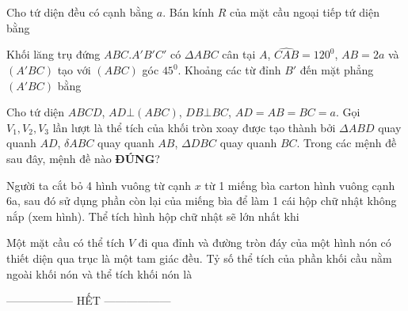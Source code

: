 \documentclass[12pt]{article}
\begin{document}
\begin{vnmultiplechoice}[keycolumns=3]
\begin{question}%
Cho tứ diện đều có cạnh bằng $a$. Bán kính $R$ của mặt cầu ngoại tiếp tứ diện bằng
\vspace{0.2cm}
\datcot
\bonpa
{}
{}
{}
{}
\end{question}

\begin{question}%
Khối lăng trụ đứng $ABC.A'B'C'$ có $\Delta ABC$ cân tại $A$, $\widehat{CAB}=120^0$, $AB=2a$ và $(A'BC)$ tạo với $(ABC)$ góc $45^0$. Khoảng các từ đỉnh $B'$ đến mặt phẳng $(A'BC)$ bằng
\vspace{0.2cm}
\datcot
\bonpa
{}
{}
{}
{}
\end{question}

\begin{question}%
Cho tứ diện $ABCD$, $AD\bot (ABC)$, $DB\bot BC$, $AD=AB=BC=a$. Gọi $V_1, V_2, V_3$ lần lượt là thể tích của khối tròn xoay được tạo thành bởi $\Delta ABD$ quay quanh $AD$, $\delta ABC$ quay quanh $AB$, $\Delta DBC$ quay quanh $BC$. Trong các mệnh đề sau đây, mệnh đề nào \textbf{ĐÚNG}?
\vspace{0.2cm}
\datcot
\bonpa
{}
{}
{}
{}
\end{question}

\begin{question}%
Người ta cắt bỏ 4 hình vuông từ cạnh $x$ từ 1 miếng bìa carton hình vuông cạnh 6a, sau đó sử dụng phần còn lại của miếng bìa để làm 1 cái hộp chữ nhật không nắp (xem hình). Thể tích hình hộp chữ nhật sẽ lớn nhất khi 
\begin{center}
\end{center}
\vspace{0.2cm}
\datcot
\bonpa
{}
{}
{}
{}
\end{question}

\begin{question}%
Một mặt cầu có thể tích $V$ đi qua đỉnh và đường tròn đáy của một hình nón có thiết diện qua trục là một tam giác đều. Tỷ số thể tích của phần khối cầu nằm ngoài khối nón và thể tích khối nón là
\vspace{0.2cm}
\datcot
\bonpa
{}
{}
{}
{}
\end{question}
\begin{examclosing}
\centerline{------------------ HẾT ------------------}
\end{examclosing}
 \end{vnmultiplechoice}
\end{document}
